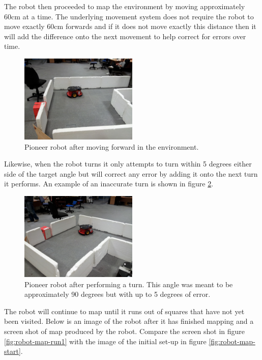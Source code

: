 \documentclass{article}
\begin{document}
The robot then proceeded to map the environment by moving approximately 60cm at a time. The underlying movement system does not require the robot to move exactly 60cm forwards and if it does not move exactly this distance then it will add the difference onto the next movement to help correct for errors over time.

\begin{figure}[H]
\centering
\includegraphics[width=0.5\textwidth]{img/robot_pics/20130416_132253.jpg}
\caption{Pioneer robot after moving forward in the environment.}
\label{fig:robot-map-moved}
\end{figure}

Likewise, when the robot turns it only attempts to turn within 5 degrees either side of the target angle but will correct any error by adding it onto the next turn it performs. An example of an inaccurate turn is shown in figure \ref{fig:robot-map-turned}.

\begin{figure}[H]
\centering
\includegraphics[width=0.5\textwidth]{img/robot_pics/20130416_132300.jpg}
\caption{Pioneer robot after performing a turn. This angle was meant to be approximately 90 degrees but with up to 5 degrees of error.}
\label{fig:robot-map-turned}
\end{figure}

The robot will continue to map until it runs out of squares that have not yet been visited. Below is an image of the robot after it has finished mapping and a screen shot of map produced by the robot. Compare the screen shot in figure \ref{fig:robot-map-run1} with the image of the initial set-up in figure \ref{fig:robot-map-start}.
\end{document}
